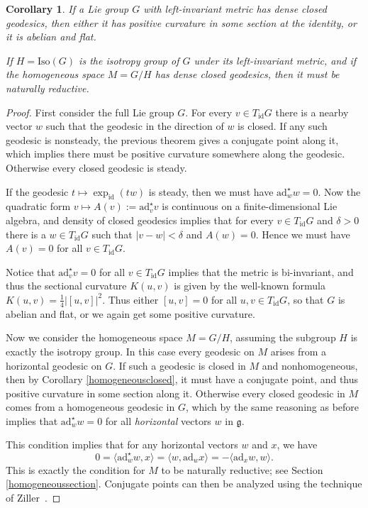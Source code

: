 \documentclass[oneside, 11pt]{amsart}
\newtheorem{corollary}[theorem]{Corollary}
\numberwithin{equation}{section}
\newcommand{\ad}{\mathrm{ad}}
\newcommand{\adstar}{\ad^{\star}}
\newcommand{\id}{\mathrm{id}}
\begin{document}
\begin{corollary}
If a Lie group $G$ with left-invariant metric has dense closed geodesics, then either it has positive curvature in some section at the identity, or it is abelian and flat.

If $H=\mathrm{Iso}(G)$ is the isotropy group of $G$ under its left-invariant metric, and if the homogeneous space $M=G/H$ has dense closed geodesics, then it must be naturally reductive. 
\end{corollary}

\begin{proof}
First consider the full Lie group $G$. For every $v\in T_{\id}G$ there is a nearby vector $w$ such that the geodesic in the direction of $w$ is closed. If any such geodesic is nonsteady, the previous theorem gives a conjugate point along it, which implies there must be positive curvature somewhere along the geodesic. Otherwise every closed geodesic is steady. 

If the geodesic $t\mapsto \exp_{\id}(tw)$ is steady, then we must have $\adstar_ww=0$. Now the quadratic form $v\mapsto A(v) := \adstar_vv$ is continuous 
on a finite-dimensional Lie algebra, and density of closed geodesics implies that for every $v\in T_{\id}G$ and $\delta>0$ there is a $w\in T_{\id}G$ such that $\lvert v-w\rvert<\delta$ and $A(w)=0$. Hence we must have $A(v)=0$ for all $v\in T_{\id}G$. 
 
Notice that $\adstar_vv=0$ for all $v\in T_{\id}G$ implies that the metric is bi-invariant, and thus the sectional curvature $K(u,v)$ is given by the well-known formula $K(u,v) = \tfrac{1}{4} \lvert [u,v]\rvert^2$. Thus either $[u,v]=0$ for all $u,v\in T_{\id}G$, so that $G$ is abelian and flat, or we again get some positive curvature.

Now we consider the homogeneous space $M=G/H$, assuming the subgroup $H$ is exactly the isotropy group. In this case every geodesic on $M$ arises from a horizontal geodesic on $G$. If such a geodesic is closed in $M$ and nonhomogeneous, then by Corollary \ref{homogeneousclosed}, it must have a conjugate point, and thus positive curvature in some section along it. Otherwise every closed geodesic in $M$ comes from a homogeneous geodesic in $G$, which by the same reasoning as before implies that $\adstar_ww=0$ for all \emph{horizontal} vectors $w$ in $\mathfrak{g}$. 

This condition implies that for any horizontal vectors $w$ and $x$, we have 
$$ 0 = \langle \adstar_ww, x\rangle = \langle w, \ad_wx\rangle = -\langle \ad_xw, w\rangle. $$
This is exactly the condition for $M$ to be naturally reductive; see Section \ref{homogeneoussection}. Conjugate points can then be analyzed using the technique of Ziller~\cite{Ziller2}.  
\end{proof} 
 
\end{document}
